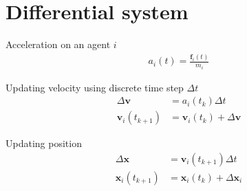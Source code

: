 \section{Differential system}
Acceleration on an agent $ i $
\begin{align}
a_{i}(t) = \frac{\mathbf{f}_{i}(t)}{m_{i}}
\end{align}

Updating velocity using discrete time step $ \Delta t $
\begin{align}
\Delta \mathbf{v} &= a_{i}(t_{k}) \Delta t \\
\mathbf{v}_{i}(t_{k+1}) &= \mathbf{v}_{i}(t_{k}) + \Delta \mathbf{v}
\end{align}

Updating position
\begin{align}
\Delta \mathbf{x} &= \mathbf{v}_{i}(t_{k+1}) \Delta t \\
\mathbf{x}_{i}(t_{k+1}) &= \mathbf{x}_{i}(t_{k}) + \Delta \mathbf{x}_{i}
\end{align}
